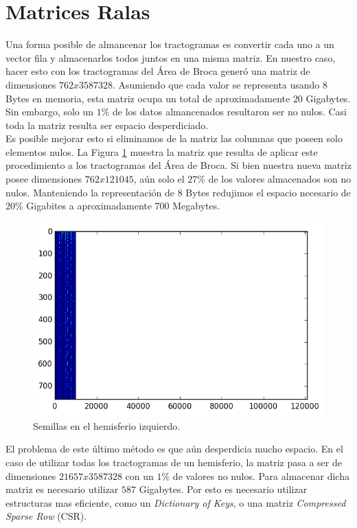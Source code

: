 \section{Matrices Ralas}

Una forma posible de almancenar los tractogramas es convertir cada uno a un 
vector fila y almacenarlos todos juntos en una misma matriz. En nuestro caso,
hacer esto con los tractogramas del \'Area de Broca gener\'o una matriz de dimensiones
$762x3587328$. Asumiendo que cada valor se representa usando $8$ Bytes en memoria, 
esta matriz ocupa un total de aproximadamente $20$ Gigabytes. Sin embargo, solo
un $1\%$ de los datos almancenados resultaron ser no nulos. Casi toda la matriz
resulta ser espacio desperdiciado.\\

Es posible mejorar esto si eliminamos de la matriz las columnas que poseen solo
elementos nulos. La Figura \ref{fig:densa} muestra la matriz que resulta de aplicar
este procedimiento a los tractogramas del \'Area de Broca. Si bien nuestra nueva
matriz posee dimensiones $762x121045$, a\'un solo el $27\%$ de los valores 
almacenados son no nulos. Manteniendo la representaci\'on de $8$ Bytes redujimos
el espacio necesario de $20\%$ Gigabites a aproximadamente $700$ Megabytes.\\

\begin{figure}[h!]
   \centering
    \includegraphics[width=\textwidth]{img/densa_broca.png}
    \caption{Semillas en el hemisferio izquierdo. }
    \label{fig:densa}
\end{figure}

El problema de este \'ultimo m\'etodo es que a\'un desperdicia mucho espacio. En
el caso de utilizar todas los tractogramas de un hemisferio, la matriz pasa a ser
de dimensiones $21657x3587328$ con un $1\%$ de valores no nulos. Para almacenar
dicha matriz es necesario utilizar $587$ Gigabytes. Por esto es necesario
utilizar estructuras mas eficiente, como un \textit{Dictionary of Keys}, o
una matriz \textit{Compressed Sparse Row} (CSR). \\

